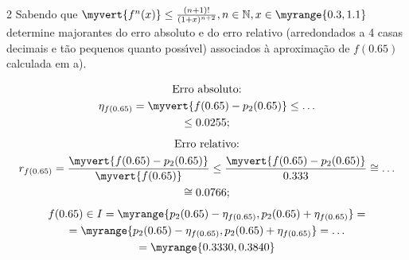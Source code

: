 \documentclass["CN_A-Exercises_Resolutions.tex"]{subfiles}
\begin{document}
\begin{questionBox}2{} %
  Sabendo que \(
    \myvert{f^{n}(x)}
    \leq\frac
    {(n+1)!}
    {(1+x)^{n+2}}
    ,n\in\mathbb{N}
    ,x\in\myrange{0.3,1.1}
  \) determine majorantes do erro absoluto e do erro relativo (arredondados a 4 casas decimais e tão pequenos quanto possı́vel) associados à aproximação de \(f(0.65)\) calculada em a).

  \answer{}

  \begin{gather*}
    \text{Erro absoluto:} \\
    \eta_{f(0.65)}
    = \myvert{f(0.65)-p_2(0.65)}
    \leq \dots \\
    \leq 0.0255
    ;\\[1ex]
    \text{Erro relativo:} \\
    r_{f(0.65)}
    = \frac
    { \myvert{f(0.65)-p_2(0.65)} }
    { \myvert{f(0.65)} }
    \leq \frac
    { \myvert{f(0.65)-p_2(0.65)} }
    { 0.333 }
    \cong \dots \\
    \cong \num{0.0766}
    ;\\[1ex]
    f(0.65) \in I
    = \myrange{
      p_2(0.65)-\eta_{f(0.65)},
      p_2(0.65)+\eta_{f(0.65)}
    }
    = \\
    = \myrange{
      p_2(0.65)-\eta_{f(0.65)},
      p_2(0.65)+\eta_{f(0.65)}
    }
    = \dots \\
    = \myrange{
      0.3330,
      0.3840
    }
  \end{gather*}


\end{questionBox}
\end{document}
